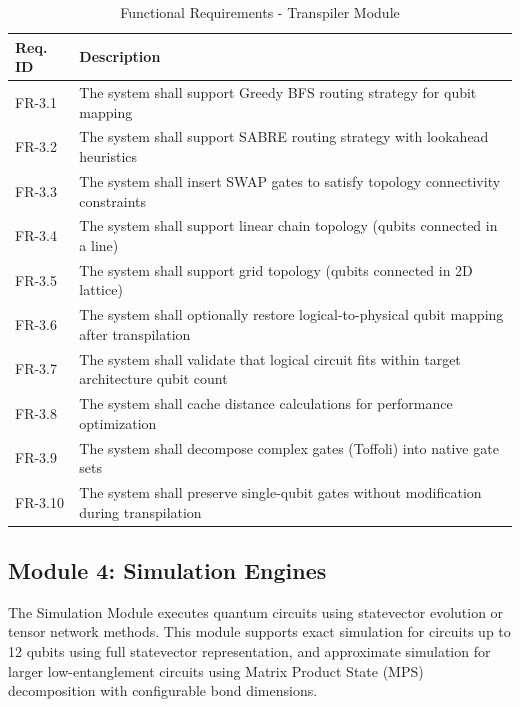 \begin{table}[H]
\centering
\caption{Functional Requirements - Transpiler Module}
\begin{tabular}{|p{2cm}|p{11cm}|}
\hline
\textbf{Req. ID} & \textbf{Description} \\
\hline
FR-3.1 & The system shall support Greedy BFS routing strategy for qubit mapping \\
\hline
FR-3.2 & The system shall support SABRE routing strategy with lookahead heuristics \\
\hline
FR-3.3 & The system shall insert SWAP gates to satisfy topology connectivity constraints \\
\hline
FR-3.4 & The system shall support linear chain topology (qubits connected in a line) \\
\hline
FR-3.5 & The system shall support grid topology (qubits connected in 2D lattice) \\
\hline
FR-3.6 & The system shall optionally restore logical-to-physical qubit mapping after transpilation \\
\hline
FR-3.7 & The system shall validate that logical circuit fits within target architecture qubit count \\
\hline
FR-3.8 & The system shall cache distance calculations for performance optimization \\
\hline
FR-3.9 & The system shall decompose complex gates (Toffoli) into native gate sets \\
\hline
FR-3.10 & The system shall preserve single-qubit gates without modification during transpilation \\
\hline
\end{tabular}
\end{table}

\subsection{Module 4: Simulation Engines}

The Simulation Module executes quantum circuits using statevector evolution or tensor network methods. This module supports exact simulation for circuits up to 12 qubits using full statevector representation, and approximate simulation for larger low-entanglement circuits using Matrix Product State (MPS) decomposition with configurable bond dimensions.

